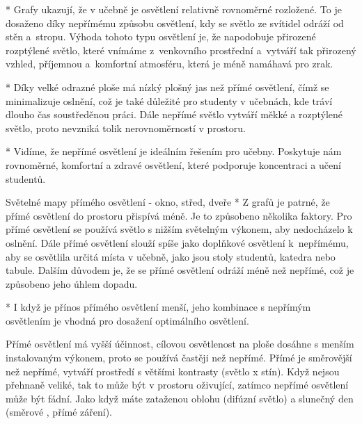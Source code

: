 \begitems
    * Grafy ukazují, že v učebně je osvětlení relativně rovnoměrné rozložené.
    To je dosaženo díky nepřímému způsobu osvětlení, kdy se světlo ze svítidel odráží od stěn a~stropu.
    Výhoda tohoto typu osvětlení je, že napodobuje přirozené rozptýlené světlo, které vnímáme z~venkovního prostřední
    a~vytváří tak přirozený vzhled, příjemnou a~komfortní atmosféru, která je méně namáhavá pro zrak.

    * Díky velké odrazné ploše má nízký plošný jas než přímé osvětlení, čímž se minimalizuje oslnění, což je také důležité pro
    studenty v učebnách, kde tráví dlouho čas soustředěnou práci.
    Dále nepřímé světlo vytváří měkké a rozptýlené světlo, proto nevzniká tolik nerovnoměrností v prostoru.

    * Vidíme, že nepřímé osvětlení je ideálním řešením pro učebny. Poskytuje nám rovnoměrné,
    komfortní a zdravé osvětlení, které podporuje koncentraci a učení studentů.
\enditems

\medskip {} Světelné mapy přímého osvětlení - okno, střed, dveře
\begitems
  *  Z grafů je patrné, že přímé osvětlení do prostoru přispívá méně. Je to způsobeno několika faktory.
    Pro přímé osvětlení se používá světlo s nižším světelným výkonem, aby nedocházelo k oslnění.
    Dále přímé osvětlení slouží spíše jako doplňkové osvětlení k~nepřímému, aby se osvětlila určitá místa v učebně,
    jako jsou stoly studentů, katedra nebo tabule. Dalším důvodem je, že se přímé osvětlení odráží
    méně než nepřímé, což je způsobeno jeho úhlem dopadu.

  *  I když je přínos přímého osvětlení menší, jeho kombinace s nepřímým osvětlením je vhodná pro dosažení
    optimálního osvětlení.


Přímé osvětlení má vyšší účinnost, cílovou osvětlenost na ploše dosáhne s menším instalovaným výkonem,
proto se používá častěji než nepřímé. Přímé je směrovější než nepřímé, vytváří prostředí s většími kontrasty
(světlo x stín). Když nejsou přehnaně veliké, tak to může být v prostoru oživující, zatímco nepřímé osvětlení může být fádní.
Jako když máte zataženou oblohu (difúzní světlo) a slunečný den (směrové , přímé záření).

